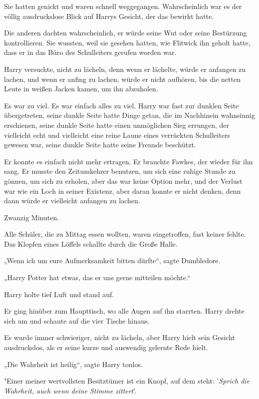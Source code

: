 {Sie hatten genickt und waren schnell weggegangen. Wahrscheinlich war es der völlig ausdruckslose Blick auf Harrys Gesicht, der das bewirkt hatte.

Die anderen dachten wahrscheinlich, er würde seine Wut oder seine Bestürzung kontrollieren. Sie wussten, weil sie gesehen hatten, wie Flitwick ihn geholt hatte, dass er in das Büro des Schulleiters gerufen worden war.

Harry versuchte, nicht zu lächeln, denn wenn er lächelte, würde er anfangen zu lachen, und wenn er anfing zu lachen, würde er nicht aufhören, bis die netten Leute in weißen Jacken kamen, um ihn abzuholen.

Es war zu viel. Es war einfach alles zu viel. Harry war fast zur dunklen Seite übergetreten, seine dunkle Seite hatte Dinge getan, die im Nachhinein wahnsinnig erschienen, seine dunkle Seite hatte einen unmöglichen Sieg errungen, der vielleicht echt und vielleicht eine reine Laune eines verrückten Schulleiters gewesen war, seine dunkle Seite hatte seine Freunde beschützt.

Er konnte es einfach nicht mehr ertragen. Er brauchte Fawkes, der wieder für ihn sang. Er musste den Zeitumkehrer benutzen, um sich eine ruhige Stunde zu gönnen, um sich zu erholen, aber das war keine Option mehr, und der Verlust war wie ein Loch in seiner Existenz, aber daran konnte er nicht denken, denn dann würde er vielleicht anfangen zu lachen.

Zwanzig Minuten.

Alle Schüler, die zu Mittag essen wollten, waren eingetroffen, fast keiner fehlte. Das Klopfen eines Löffels schallte durch die Große Halle.

„Wenn ich um eure Aufmerksamkeit bitten dürfte“, sagte Dumbledore.

„Harry Potter hat etwas, das er uns gerne mitteilen möchte.“

Harry holte tief Luft und stand auf.

Er ging hinüber zum Haupttisch, wo alle Augen auf ihn starrten. Harry drehte sich um und schaute auf die vier Tische hinaus.

Es wurde immer schwieriger, nicht zu lächeln, aber Harry hielt sein Gesicht ausdruckslos, als er seine kurze und auswendig gelernte Rede hielt.

„Die Wahrheit ist heilig“, sagte Harry tonlos.

"Einer meiner wertvollsten Besitztümer ist ein Knopf, auf dem steht: '\emph{Sprich die Wahrheit, auch wenn deine Stimme zittert}'.

}
